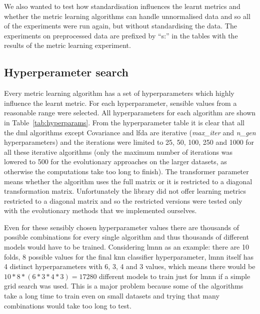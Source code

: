 \documentclass[12pt,a4paper]{report}
\begin{document}
We also wanted to test how standardisation influences the learnt metrics and whether the metric learning algorithms can handle unnormalised data and so all of the experiments were run again, but without standardising the data. The experiments on preprocessed data are prefixed by ``s:'' in the tables with the results of the metric learning experiment.

\subsection{Hyperperameter search} \label{chap:exp:hypsearch}

Every metric learning algorithm has a set of hyperparameters which highly influence the learnt metric. For each hyperparameter, sensible values from a reasonable range were selected. All hyperparameters for each algorithm are shown in Table~\ref{tab:hyperparams}. From the hyperparameter table it is clear that all the \ac{dml} algorithms except Covariance and \ac{lfda} are iterative (\textit{max\_iter} and \textit{n\_gen} hyperparameters) and the iterations were limited to 25, 50, 100, 250 and 1000 for all these iterative algorithms (only the maximum number of iterations was lowered to 500 for the evolutionary approaches on the larger datasets, as otherwise the computations take too long to finish). The transformer parameter means whether the algorithm uses the full matrix or it is restricted to a diagonal transformation matrix. Unfortunately the library did not offer learning metrics restricted to a diagonal matrix and so the restricted versions were tested only with the evolutionary methods that we implemented ourselves.



Even for these sensibly chosen hyperparameter values there are thousands of possible combinations for every single algorithm and thus thousands of different models would have to be trained. Considering \ac{lmnn} as an example: there are 10 folds, 8 possible values for the final \ac{knn} classifier hyperparameter, \ac{lmnn} itself has 4 distinct hyperparameters with 6, 3, 4 and 3 values, which means there would be $10*8*(6*3*4*3)=17280$ different models to train just for \ac{lmnn} if a simple grid search was used. This is a major problem because some of the algorithms take a long time to train even on small datasets and trying that many combinations would take too long to test.
\end{document}
